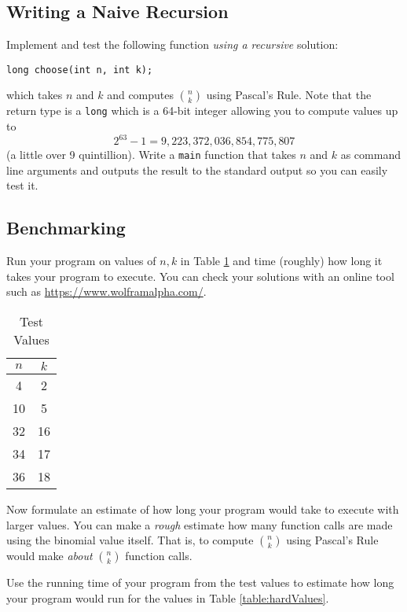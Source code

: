\documentclass[12pt]{scrartcl}
\begin{document}
\subsection*{Writing a Naive Recursion}

Implement and test the following function \emph{using a recursive} 
solution:

\texttt{long choose(int n, int k);}

which takes $n$ and $k$ and computes ${n\choose k}$ using Pascal's Rule.
Note that the return type is a \texttt{long} which is a 64-bit
integer allowing you to compute values up to 
  $$2^{63}-1 = 9,223,372,036,854,775,807$$
(a little over 9 quintillion).  Write a \texttt{main} function
that takes $n$ and $k$ as command line arguments and outputs the result
to the standard output so you can easily test it.

\subsection*{Benchmarking}

Run your program on values of $n, k$ in Table \ref{table:easyValues} 
and time (roughly) how long it takes your program to execute.  You
can check your solutions with an online tool such as 
\url{https://www.wolframalpha.com/}.

\begin{table}[ht]
\centering
\begin{tabular}{c|c}
$n$ & $k$ \\
\hline\hline
4 & 2 \\
10 & 5 \\
32 & 16 \\  %
34 & 17 \\  %
36 & 18 \\ %
\end{tabular}
\caption{Test Values}
\label{table:easyValues}
\end{table}

Now formulate an estimate of how long your program would take to 
execute with larger values.  You can make a \emph{rough} estimate 
how many function calls are made using the binomial value itself.  
That is, to compute ${n \choose k}$ using Pascal's Rule would make 
\emph{about} ${n \choose k}$ function calls.

Use the running time of your program from the test values to 
estimate how long your program would run for the values in 
Table \ref{table:hardValues}.
\end{document}
